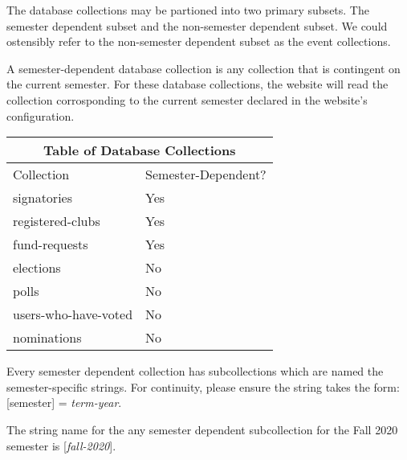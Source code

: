 \documentclass[a4paper]{article}
\begin{document}
The database collections may be partioned into two primary subsets. The semester dependent subset and the non-semester dependent subset. We could ostensibly refer to the non-semester dependent subset as the event collections.

\begin{definition*}
A semester-dependent database collection is any collection that is contingent on the current semester. For these database collections, the website will read the collection corrosponding to the current semester declared in the website's configuration.
\end{definition*}

\begin{center}
\begin{tabular}{ |p{4cm}||p{4cm}|  }
 \hline
 \multicolumn{2}{|c|}{Table of Database Collections} \\
 \hline
 Collection & Semester-Dependent? \\
 \hline
 signatories & Yes \\
 registered-clubs & Yes \\
 fund-requests & Yes \\
 \hline
 elections & No \\
 polls & No \\
 users-who-have-voted & No \\
 nominations & No \\
 \hline
\end{tabular}
\end{center}

%

\begin{note*}
Every semester dependent collection has subcollections which are named the semester-specific strings. For continuity, please ensure the string takes the form: [semester] = \textit{term-year}.
\end{note*}

\begin{example*}
The string name for the any semester dependent subcollection for the Fall 2020 semester is [\textit{fall-2020}].
\end{example*}
\end{document}

